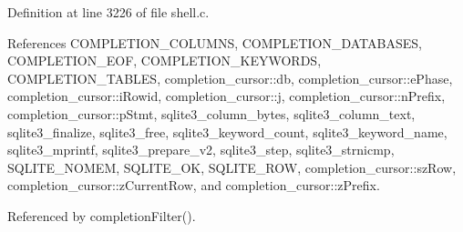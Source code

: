 Definition at line 3226 of file shell.\+c.



References C\+O\+M\+P\+L\+E\+T\+I\+O\+N\+\_\+\+C\+O\+L\+U\+M\+NS, C\+O\+M\+P\+L\+E\+T\+I\+O\+N\+\_\+\+D\+A\+T\+A\+B\+A\+S\+ES, C\+O\+M\+P\+L\+E\+T\+I\+O\+N\+\_\+\+E\+OF, C\+O\+M\+P\+L\+E\+T\+I\+O\+N\+\_\+\+K\+E\+Y\+W\+O\+R\+DS, C\+O\+M\+P\+L\+E\+T\+I\+O\+N\+\_\+\+T\+A\+B\+L\+ES, completion\+\_\+cursor\+::db, completion\+\_\+cursor\+::e\+Phase, completion\+\_\+cursor\+::i\+Rowid, completion\+\_\+cursor\+::j, completion\+\_\+cursor\+::n\+Prefix, completion\+\_\+cursor\+::p\+Stmt, sqlite3\+\_\+column\+\_\+bytes, sqlite3\+\_\+column\+\_\+text, sqlite3\+\_\+finalize, sqlite3\+\_\+free, sqlite3\+\_\+keyword\+\_\+count, sqlite3\+\_\+keyword\+\_\+name, sqlite3\+\_\+mprintf, sqlite3\+\_\+prepare\+\_\+v2, sqlite3\+\_\+step, sqlite3\+\_\+strnicmp, S\+Q\+L\+I\+T\+E\+\_\+\+N\+O\+M\+EM, S\+Q\+L\+I\+T\+E\+\_\+\+OK, S\+Q\+L\+I\+T\+E\+\_\+\+R\+OW, completion\+\_\+cursor\+::sz\+Row, completion\+\_\+cursor\+::z\+Current\+Row, and completion\+\_\+cursor\+::z\+Prefix.



Referenced by completion\+Filter().


